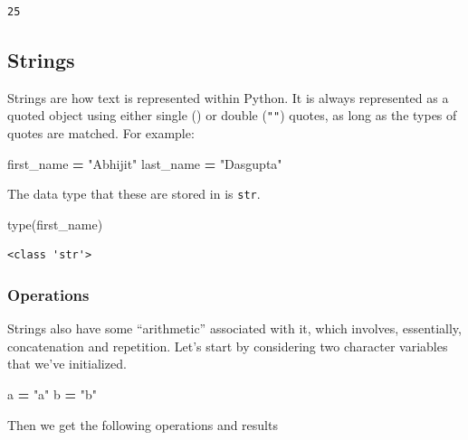 \documentclass[
  letterpaper,
]{scrbook}
\newenvironment{Shaded}{\begin{snugshade}}{\end{snugshade}}
\newcommand{\BuiltInTok}[1]{#1}
\newcommand{\NormalTok}[1]{#1}
\newcommand{\OperatorTok}[1]{\textcolor[rgb]{0.81,0.36,0.00}{\textbf{#1}}}
\newcommand{\StringTok}[1]{\textcolor[rgb]{0.31,0.60,0.02}{#1}}
\begin{document}
\begin{verbatim}
25
\end{verbatim}

\hypertarget{strings}{%
\subsection{Strings}\label{strings}}

Strings are how text is represented within Python. It is always represented as a quoted object using either single (\texttt{\textquotesingle{}\textquotesingle{}}) or double (\texttt{""}) quotes, as long as the types of quotes are matched. For example:

\begin{Shaded}
\begin{Highlighting}[]
\NormalTok{first_name }\OperatorTok{=} \StringTok{"Abhijit"}
\NormalTok{last_name }\OperatorTok{=} \StringTok{"Dasgupta"}
\end{Highlighting}
\end{Shaded}

The data type that these are stored in is \texttt{str}.

\begin{Shaded}
\begin{Highlighting}[]
\BuiltInTok{type}\NormalTok{(first_name)}
\end{Highlighting}
\end{Shaded}

\begin{verbatim}
<class 'str'>
\end{verbatim}

\hypertarget{operations}{%
\subsubsection{Operations}\label{operations}}

Strings also have some ``arithmetic'' associated with it, which involves, essentially, concatenation and repetition. Let's start by considering two character variables that we've initialized.

\begin{Shaded}
\begin{Highlighting}[]
\NormalTok{a }\OperatorTok{=} \StringTok{"a"}
\NormalTok{b }\OperatorTok{=} \StringTok{"b"}
\end{Highlighting}
\end{Shaded}

Then we get the following operations and results
\end{document}
